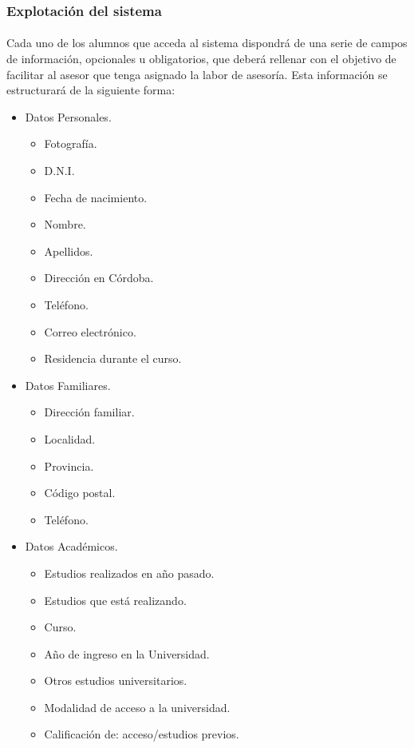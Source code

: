       \subsubsection{Explotación del sistema}

      \paragraph{}Cada uno de los alumnos que acceda al sistema dispondrá
      de una serie de campos de información, opcionales u obligatorios, que
      deberá rellenar con el objetivo de facilitar al asesor que tenga asignado
      la labor de asesoría. Esta información se estructurará de la siguiente
      forma:

      \begin{itemize}
         \item Datos Personales.
         \begin{itemize}
            \item Fotografía.
            \item D.N.I.
            \item Fecha de nacimiento.
            \item Nombre.
            \item Apellidos.
            \item Dirección en Córdoba.
            \item Teléfono.
            \item Correo electrónico.
            \item Residencia durante el curso.
         \end{itemize}
         \item Datos Familiares.
         \begin{itemize}
            \item Dirección familiar.
            \item Localidad.
            \item Provincia.
            \item Código postal.
            \item Teléfono.
         \end{itemize}
         \item Datos Académicos.
         \begin{itemize}
            \item Estudios realizados en año pasado.
            \item Estudios que está realizando.
            \item Curso.
            \item Año de ingreso en la Universidad.
            \item Otros estudios universitarios.
            \item Modalidad de acceso a la universidad.
            \item Calificación de: acceso/estudios previos.
         \end{itemize}
      \end{itemize}

